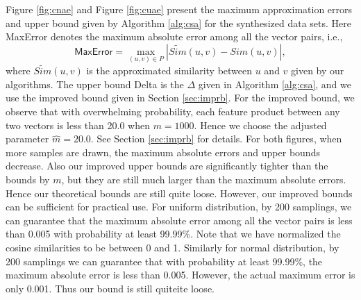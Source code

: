 \documentclass{article}
\begin{document}
Figure \ref{fig:cnae} and Figure \ref{fig:cuae} present the maximum approximation errors and upper bound given by Algorithm \ref{alg:csa} for the synthesized data sets.
Here \textsf{MaxError} denotes the maximum absolute error among all the vector pairs, i.e.,
$$\textsf{MaxError} = \max_{(u,v)\in P} |\widetilde{Sim}(u,v) - Sim(u,v)|,$$
where $\widetilde{Sim}(u,v)$ is the approximated similarity between $u$ and $v$ given by our algorithms. The upper bound \textsf{Delta} is the $\Delta$ given in Algorithm \ref{alg:csa}, and we use the improved bound given in Section \ref{sec:imprb}. For the improved bound, we observe that with overwhelming probability, each feature product between any two vectors is less than 20.0 when $m=1000$. Hence we choose the adjusted parameter $\hat{m} = 20.0$. See Section \ref{sec:imprb} for details. 
For both figures, when more samples are drawn, the maximum absolute errors and upper bounds decrease. Also our improved upper bounds are significantly tighter than the bounds by $m$, but they are still much larger than the maximum absolute errors. Hence our theoretical bounds are still quite loose. However, our improved bounds can be sufficient for practical use. For uniform distribution, by 200 samplings, we can guarantee that the maximum absolute error among all the vector pairs is less than 0.005 with probability at least 99.99\%. Note that we have normalized the cosine similarities to be between 0 and 1. Similarly for normal distribution, by 200 samplings we can guarantee that with probability at least 99.99\%, the maximum absolute error is less than 0.005. However, the actual maximum error is only 0.001. Thus our bound is still quiteite loose.
\end{document}
